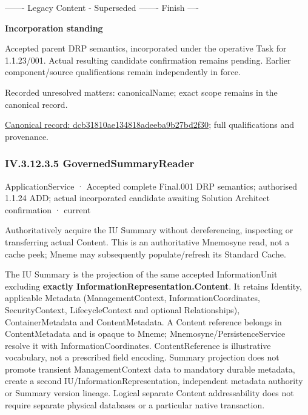 ------- Legacy Content - Superseded ------- Finish ----



\par\medskip\textbf{Incorporation standing}\par


Accepted parent DRP semantics, incorporated under the operative Task for 1.1.23/001. Actual resulting candidate confirmation remains pending. Earlier component/source qualifications remain independently in force.


{\small Recorded unresolved matters: canonicalName; exact scope remains in the canonical record.}\par
{\footnotesize \href{../../../../continuum/application/application-service/dcb31810ae134818adeeba9b27bd2f30.md}{Canonical record: dcb31810ae134818adeeba9b27bd2f30}; full qualifications and provenance.}\par
\subsubsection*{IV.3.12.3.5 GovernedSummaryReader}
\label{navigation:IV.3.12.3.5}

\label{element:2988247b75664896a7deb97b12b20c0a}
{\small ApplicationService · Accepted complete Final.001 DRP semantics; authorised 1.1.24 ADD; actual incorporated candidate awaiting Solution Architect confirmation · current}\par

Authoritatively acquire the IU Summary without dereferencing, inspecting or transferring actual Content. This is an authoritative Mnemosyne read, not a cache peek; Mneme may subsequently populate/refresh its Standard Cache.



The IU Summary is the projection of the same accepted InformationUnit excluding \textbf{exactly InformationRepresentation.Content}. It retains Identity, applicable Metadata (ManagementContext, InformationCoordinates, SecurityContext, LifecycleContext and optional Relationships), ContainerMetadata and ContentMetadata. A Content reference belongs in ContentMetadata and is opaque to Mneme; Mnemosyne/PersistenceService resolve it with InformationCoordinates. ContentReference is illustrative vocabulary, not a prescribed field encoding. Summary projection does not promote transient ManagementContext data to mandatory durable metadata, create a second IU/InformationRepresentation, independent metadata authority or Summary version lineage. Logical separate Content addressability does not require separate physical databases or a particular native transaction.



